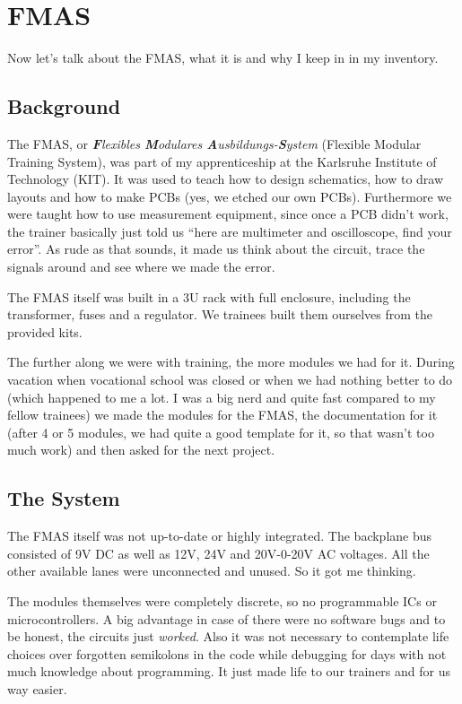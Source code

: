 \chapter{FMAS}
Now let's talk about the FMAS, what it is and why I keep in in my inventory.

\section{Background}
The FMAS, or \textit{\textbf{F}lexibles \textbf{M}odulares \textbf{A}usbildungs-\textbf{S}ystem} (Flexible Modular Training System), was part of my apprenticeship at the Karlsruhe Institute of Technology (KIT). It was used to teach how to design schematics, how to draw layouts and how to make PCBs (yes, we etched our own PCBs). Furthermore we were taught how to use measurement equipment, since once a PCB didn't work, the trainer basically just told us ``here are multimeter and oscilloscope, find your error''. As rude as that sounds, it made us think about the circuit, trace the signals around and see where we made the error. 

The FMAS itself was built in a 3U rack with full enclosure, including the transformer, fuses and a regulator. We trainees built them ourselves from the provided kits.

The further along we were with training, the more modules we had for it. During vacation when vocational school was closed or when we had nothing better to do (which happened to me a lot. I was a big nerd and quite fast compared to my fellow trainees) we made the modules for the FMAS, the documentation for it (after 4 or 5 modules, we had quite a good template for it, so that wasn't too much work) and then asked for the next project. 

\section{The System}
The FMAS itself was not up-to-date or highly integrated. The backplane bus consisted of 9V DC as well as 12V, 24V and 20V-0-20V AC voltages. All the other available lanes were unconnected and unused. So it got me thinking. 

The modules themselves were completely discrete, so no programmable ICs or microcontrollers. A big advantage in case of there were no software bugs and to be honest, the circuits just \textit{worked}. Also it was not necessary to contemplate life choices over forgotten semikolons in the code while debugging for days with not much knowledge about programming. It just made life to our trainers and for us way easier. 

